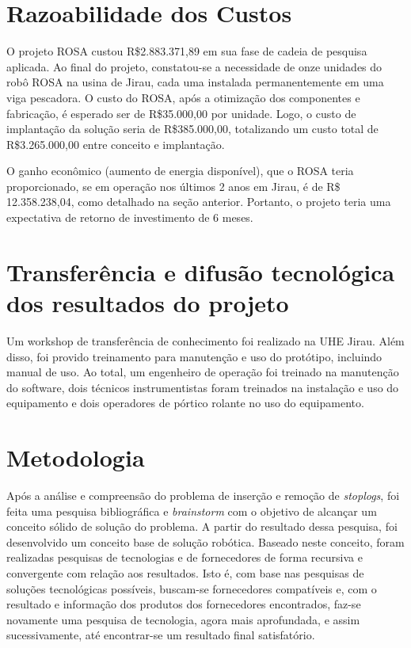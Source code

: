  
     
\section{Razoabilidade dos Custos}
O projeto ROSA custou R\$2.883.371,89 em sua fase de cadeia de pesquisa
aplicada. Ao final do projeto, constatou-se a necessidade de onze unidades 
do robô ROSA na usina de Jirau, cada uma instalada permanentemente em uma viga
pescadora.
O custo do ROSA, após a otimização dos componentes e fabricação, é esperado ser de
R\$35.000,00 por unidade. Logo, o custo de implantação da solução seria de
R\$385.000,00, totalizando um custo total de R\$3.265.000,00 entre conceito e
implantação.

O ganho econômico (aumento de energia disponível), que o ROSA teria
proporcionado, se em operação nos últimos 2 anos em Jirau, é de R\$
12.358.238,04, como detalhado na seção anterior. Portanto, o projeto teria uma
expectativa de retorno de investimento de 6 meses.

\section{Transferência e difusão tecnológica dos resultados do projeto}
Um workshop de transferência de conhecimento foi realizado na UHE Jirau. 
Além disso, foi provido treinamento para manutenção e uso do protótipo,
incluindo  manual de uso. Ao total, um engenheiro de operação foi treinado na 
manutenção do software, dois técnicos instrumentistas foram treinados na
instalação e uso do equipamento e dois operadores de pórtico rolante no uso do
equipamento.

\section{Metodologia}

Após a análise e compreensão do problema de inserção e remoção de
\textit{stoplogs}, foi feita uma pesquisa bibliográfica e \textit{brainstorm}
com o objetivo de alcançar um conceito sólido de solução do problema. A partir
do resultado dessa pesquisa, foi desenvolvido um conceito base de solução robótica. 
Baseado neste conceito, foram realizadas pesquisas de tecnologias e de fornecedores 
de forma recursiva e convergente com relação aos resultados. Isto é, com base
nas pesquisas de soluções tecnológicas possíveis, buscam-se fornecedores
compatíveis e, com o resultado e informação dos produtos dos fornecedores
encontrados, faz-se novamente uma pesquisa de tecnologia, agora mais
aprofundada, e assim sucessivamente, até encontrar-se um resultado final
satisfatório.

